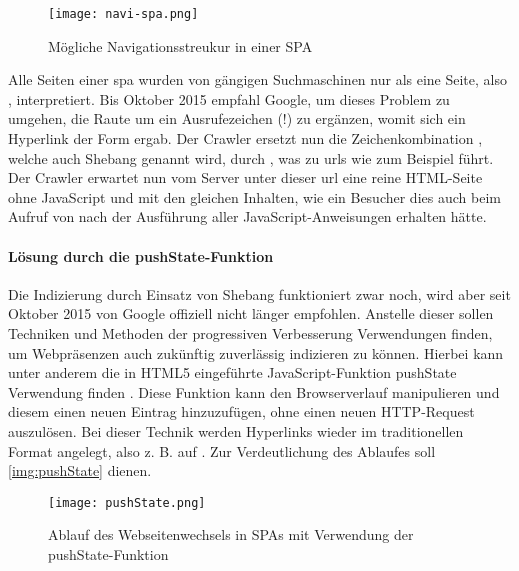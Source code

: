 \begin{figure}[H]
	\begin{center}
		\texttt{[image: navi-spa.png]}
		\caption{Mögliche Navigationsstreukur in einer SPA}
		\label{img:navi-spa}
	\end{center}
\end{figure}

Alle Seiten einer \ac{spa} wurden von gängigen Suchmaschinen nur als eine Seite, also , interpretiert. Bis Oktober 2015 empfahl Google, um dieses Problem zu umgehen, die Raute um ein Ausrufezeichen (!) zu ergänzen, womit sich ein Hyperlink der Form  ergab. Der Crawler ersetzt nun die Zeichenkombination \quotes{\#!}, welche auch Shebang genannt wird, durch , was zu \ac{url}s wie zum Beispiel  führt. Der Crawler erwartet nun vom Server unter dieser \ac{url} eine reine HTML-Seite ohne JavaScript und mit den gleichen Inhalten, wie ein Besucher dies auch beim Aufruf von  nach der Ausführung aller JavaScript-Anweisungen erhalten hätte.

\paragraph{Lösung durch die pushState-Funktion}
\label{sec:pushState}
Die Indizierung durch Einsatz von Shebang funktioniert zwar noch, wird aber seit Oktober 2015 von Google offiziell nicht länger empfohlen. Anstelle dieser sollen Techniken und Methoden der progressiven Verbesserung Verwendungen finden, um Webpräsenzen auch zukünftig zuverlässig indizieren zu können. Hierbei kann unter anderem die in HTML5 eingeführte JavaScript-Funktion pushState Verwendung finden \cite{Google2015}. Diese Funktion kann den Browserverlauf manipulieren und diesem einen neuen Eintrag hinzuzufügen, ohne einen neuen HTTP-Request auszulösen. Bei dieser Technik werden Hyperlinks wieder im traditionellen Format angelegt, also z. B. auf . Zur Verdeutlichung des Ablaufes soll \autoref{img:pushState} dienen.

\begin{figure}[H]
	\begin{center}
		\texttt{[image: pushState.png]}
		\caption{Ablauf des Webseitenwechsels in SPAs mit Verwendung der pushState-Funktion}
		\label{img:pushState}
	\end{center}
\end{figure}

